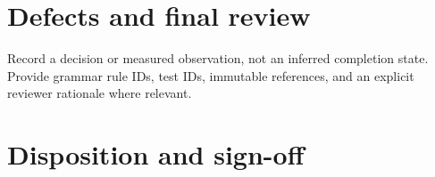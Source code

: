 \documentclass[11pt,letterpaper]{article}
\begin{document}
\section{Defects and final review}
Record a decision or measured observation, not an inferred completion state. Provide grammar rule IDs, test IDs, immutable references, and an explicit reviewer rationale where relevant.
\section{Disposition and sign-off}
\end{document}
